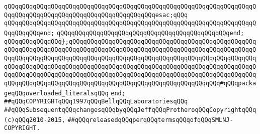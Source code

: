 \verb|qQQqqQQqqQQqqQQqqQQqqQQqqQQqqQQqqQQqqQQqqQQqqQQqqQQqqQQqqQQqqQQqqQQqqQQqqQQqqQQqqQQqqQQqqQQqqQQqqQQqqQQqqQQqqQQqesac;qQQq|\newline
\verb|qQQqqQQqqQQqqQQqqQQqqQQqqQQqqQQqqQQqqQQqqQQqqQQqqQQqqQQqqQQqqQQqqQQqqQQqqQQqqQQqend;|\newline
\verb|qQQqqQQqqQQqqQQqqQQqqQQqqQQqqQQqqQQqqQQqqQQqqQQqend;|\newline
\newline
\verb|qQQqqQQqqQQqqQQq};qQQqqQQqqQQqqQQqqQQqqQQqqQQqqQQqqQQqqQQqqQQqqQQqqQQqqQQqqQQqqQQqqQQqqQQqqQQqqQQqqQQqqQQqqQQqqQQqqQQqqQQqqQQqqQQqqQQqqQQqqQQqqQQqqQQqqQQqqQQqqQQqqQQqqQQqqQQqqQQqqQQqqQQqqQQqqQQqqQQqqQQqqQQqqQQqqQQqqQQqqQQqqQQqqQQqqQQqqQQqqQQqqQQqqQQqqQQqqQQqqQQqqQQqqQQqqQQqqQQqqQQqqQQqqQQqqQQqqQQqqQQqqQQqqQQqqQQqqQQqqQQqqQQqqQQqqQQqqQQqqQQqqQQqqQQqqQQqqQQqqQQqqQQqqQQqqQQqqQQqqQQqqQQqqQQqqQQqqQQqqQQqqQQqqQQq#qQQqpackageqQQqoverloaded_literalsqQQq|\newline
\verb|end;|\newline
\newline
\verb|##qQQqCOPYRIGHTqQQq1997qQQqBellqQQqLaboratoriesqQQq|\newline
\verb|##qQQqSubsequentqQQqchangesqQQqbyqQQqJeffqQQqProtheroqQQqCopyrightqQQq(c)qQQq2010-2015,|\newline
\verb|##qQQqreleasedqQQqperqQQqtermsqQQqofqQQqSMLNJ-COPYRIGHT.|\newline

